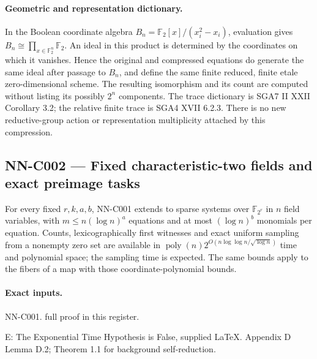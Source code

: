 \paragraph{Geometric and representation dictionary.}
In the Boolean coordinate algebra $B_n=\mathbb F_2[x]/(x_i^2-x_i)$, evaluation gives $B_n\cong\prod_{x\in\mathbb F_2^n}\mathbb F_2$. An ideal in this product is determined by the coordinates on which it vanishes. Hence the original and compressed equations do generate the same ideal after passage to $B_n$, and define the same finite reduced, finite etale zero-dimensional scheme. The resulting isomorphism and its count are computed without listing its possibly $2^n$ components. The trace dictionary is SGA7 II XXII Corollary 3.2; the relative finite trace is SGA4 XVII 6.2.3. There is no new reductive-group action or representation multiplicity attached by this compression.

\subsection{NN-C002 --- Fixed characteristic-two fields and exact preimage tasks}
\begin{proposition}[NN-C002]
For every fixed $r,k,a,b$, NN-C001 extends to sparse systems over $\mathbb F_{2^r}$ in $n$ field variables, with $m\leq n(\log n)^a$ equations and at most $(\log n)^b$ monomials per equation. Counts, lexicographically first witnesses and exact uniform sampling from a nonempty zero set are available in $\operatorname{poly}(n)2^{O(n\log\log n/\sqrt{\log n})}$ time and polynomial space; the sampling time is expected. The same bounds apply to the fibers of a map with those coordinate-polynomial bounds.
\end{proposition}
\paragraph{Exact inputs.}
NN-C001. full proof in this register.

E: The Exponential Time Hypothesis is False, supplied LaTeX. Appendix D Lemma D.2; Theorem 1.1 for background self-reduction.

